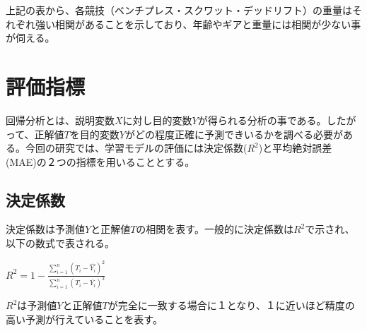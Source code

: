 \documentclass{article}
\begin{document}
上記の表から、各競技（ベンチプレス・スクワット・デッドリフト）の重量はそれぞれ強い相関があることを示しており、年齢やギアと重量には相関が少ない事が伺える。

\section{評価指標}

回帰分析とは、説明変数\begin{math}X\end{math}に対し目的変数\begin{math}Y\end{math}が得られる分析の事である。したがって、正解値\begin{math}T\end{math}を目的変数\begin{math}Y\end{math}がどの程度正確に予測できいるかを調べる必要がある。今回の研究では、学習モデルの評価には決定係数(\begin{math}R^2\end{math})と平均絶対誤差(MAE)の２つの指標を用いることとする。

\subsection{決定係数}

決定係数は予測値\begin{math}Y\end{math}と正解値\begin{math}T\end{math}の相関を表す。一般的に決定係数は\begin{math}R^2\end{math}で示され、以下の数式で表される。

\begin{center}
\begin{math}R^2=1-\frac{\sum_{i=1}^{n}(T_i-\hat{Y_i})^2}{\sum_{i=1}^{n}(T_i-\bar{Y_i})^2}\end{math}
\end{center}

\begin{math}R^2\end{math}は予測値\begin{math}Y\end{math}と正解値\begin{math}T\end{math}が完全に一致する場合に１となり、１に近いほど精度の高い予測が行えていることを表す。
\end{document}
